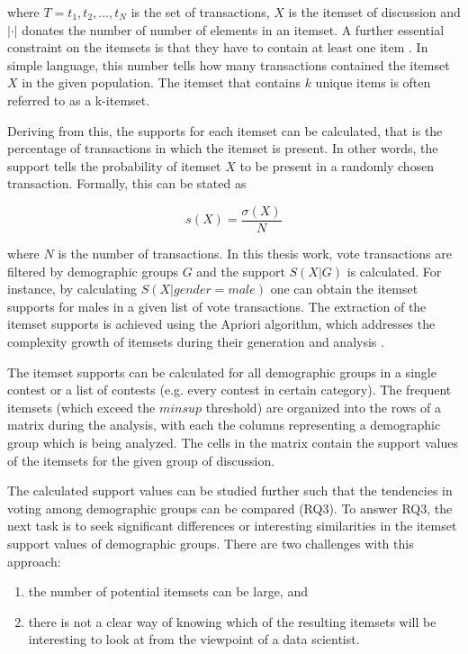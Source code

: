 where $T = {t_1, t_2, ..., t_N}$ is the set of transactions, $X$ is the itemset of discussion and $| \cdot |$ donates the number of number of elements in an itemset. A further essential constraint on the itemsets is that they have to contain at least one item \cite{introtodatamining}. In simple language, this number tells how many transactions contained the itemset $X$ in the given population. The itemset that contains $k$ unique items is often referred to as a k-itemset. 

Deriving from this, the supports for each itemset can be calculated, that is the percentage of transactions in which the itemset is present. In other words, the support tells the probability of itemset $X$ to be present in a randomly chosen transaction. Formally, this can be stated as 

\begin{equation}
    s(X) = \frac{\sigma (X)}{N}
\end{equation}

where $N$ is the number of transactions. In this thesis work, vote transactions are filtered by demographic groups $G$ and the support $S(X|G)$ is calculated. For instance, by calculating $S(X|gender = male)$ one can obtain the itemset supports for males in a given list of vote transactions. The extraction of the itemset supports is achieved using the Apriori algorithm, which addresses the complexity growth of itemsets during their generation and analysis \cite{introtodatamining}. 

The itemset supports can be calculated for all demographic groups in a single contest or a list of contests (e.g. every contest in certain category). The frequent itemsets (which exceed the $minsup$ threshold) are organized into the rows of a matrix during the analysis, with each the columns representing a demographic group which is being analyzed. The cells in the matrix contain the support values of the itemsets for the given group of discussion. 

The calculated support values can be studied further such that the tendencies in voting among demographic groups can be compared (RQ3). To answer RQ3, the next task is to seek significant differences or interesting similarities in the itemset support values of demographic groups. There are two challenges with this approach: 

\begin{enumerate}
    \item the number of potential itemsets can be large, and
    \item there is not a clear way of knowing which of the resulting itemsets will be interesting to look at from the viewpoint of a data scientist.
\end{enumerate} 

